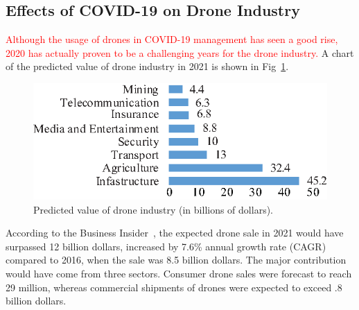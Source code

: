 \subsection{Effects of COVID-19 on Drone Industry}
\textcolor{red}{
Although the usage of drones in COVID-19 management has seen a good rise, 2020 has actually proven to be a challenging years for the drone industry.
}
A chart of the predicted value of drone industry in 2021 is shown in Fig~\ref{dronemarket}.
\begin{figure}[h!]
\centering
\includegraphics[width=.8\linewidth]{figure/dronemarket.eps}
\caption{Predicted value of drone industry (in billions of dollars).}
\label{dronemarket}
\end{figure}
According to the Business Insider~\cite{dronebusinessinsider}, the expected drone sale in 2021 would have surpassed 12 billion dollars, increased by 7.6\%  annual growth rate (CAGR) compared to 2016, when the sale was 8.5 billion dollars. %
The major contribution would have come from three sectors. Consumer drone sales were forecast to reach 29 million, whereas commercial shipments of drones were expected to exceed .8 billion dollars. 

